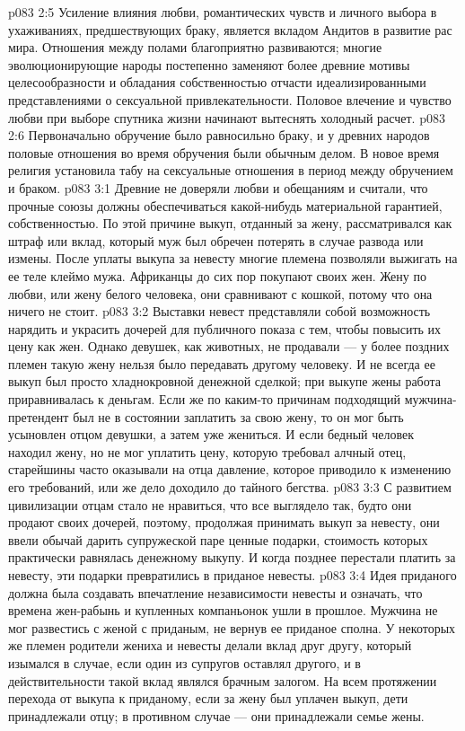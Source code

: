 \vs p083 2:5 Усиление влияния любви, романтических чувств и личного выбора в ухаживаниях, предшествующих браку, является вкладом Андитов в развитие рас мира. Отношения между полами благоприятно развиваются; многие эволюционирующие народы постепенно заменяют более древние мотивы целесообразности и обладания собственностью отчасти идеализированными представлениями о сексуальной привлекательности. Половое влечение и чувство любви при выборе спутника жизни начинают вытеснять холодный расчет.
\vs p083 2:6 Первоначально обручение было равносильно браку, и у древних народов половые отношения во время обручения были обычным делом. В новое время религия установила табу на сексуальные отношения в период между обручением и браком.
\vs p083 3:1 Древние не доверяли любви и обещаниям и считали, что прочные союзы должны обеспечиваться какой\hyp{}нибудь материальной гарантией, собственностью. По этой причине выкуп, отданный за жену, рассматривался как штраф или вклад, который муж был обречен потерять в случае развода или измены. После уплаты выкупа за невесту многие племена позволяли выжигать на ее теле клеймо мужа. Африканцы до сих пор покупают своих жен. Жену по любви, или жену белого человека, они сравнивают с кошкой, потому что она ничего не стоит.
\vs p083 3:2 Выставки невест представляли собой возможность нарядить и украсить дочерей для публичного показа с тем, чтобы повысить их цену как жен. Однако девушек, как животных, не продавали --- у более поздних племен такую жену нельзя было передавать другому человеку. И не всегда ее выкуп был просто хладнокровной денежной сделкой; при выкупе жены работа приравнивалась к деньгам. Если же по каким\hyp{}то причинам подходящий мужчина\hyp{}претендент был не в состоянии заплатить за свою жену, то он мог быть усыновлен отцом девушки, а затем уже жениться. И если бедный человек находил жену, но не мог уплатить цену, которую требовал алчный отец, старейшины часто оказывали на отца давление, которое приводило к изменению его требований, или же дело доходило до тайного бегства.
\vs p083 3:3 С развитием цивилизации отцам стало не нравиться, что все выглядело так, будто они продают своих дочерей, поэтому, продолжая принимать выкуп за невесту, они ввели обычай дарить супружеской паре ценные подарки, стоимость которых практически равнялась денежному выкупу. И когда позднее перестали платить за невесту, эти подарки превратились в приданое невесты.
\vs p083 3:4 Идея приданого должна была создавать впечатление независимости невесты и означать, что времена жен\hyp{}рабынь и купленных компаньонок ушли в прошлое. Мужчина не мог развестись с женой с приданым, не вернув ее приданое сполна. У некоторых же племен родители жениха и невесты делали вклад друг другу, который изымался в случае, если один из супругов оставлял другого, и в действительности такой вклад являлся брачным залогом. На всем протяжении перехода от выкупа к приданому, если за жену был уплачен выкуп, дети принадлежали отцу; в противном случае --- они принадлежали семье жены.

